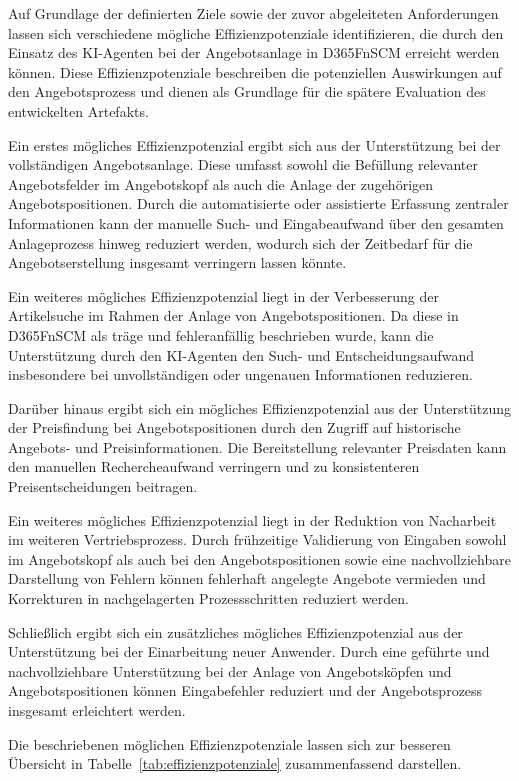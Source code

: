 Auf Grundlage der definierten Ziele sowie der zuvor abgeleiteten Anforderungen lassen sich verschiedene mögliche Effizienzpotenziale identifizieren, die durch den Einsatz des \ac{KI}-Agenten bei der Angebotsanlage in \ac{D365FnSCM} erreicht werden können. Diese Effizienzpotenziale beschreiben die potenziellen Auswirkungen auf den Angebotsprozess und dienen als Grundlage für die spätere Evaluation des entwickelten Artefakts.

Ein erstes mögliches Effizienzpotenzial ergibt sich aus der Unterstützung bei der vollständigen Angebotsanlage. Diese umfasst sowohl die Befüllung relevanter Angebotsfelder im Angebotskopf als auch die Anlage der zugehörigen Angebotspositionen. Durch die automatisierte oder assistierte Erfassung zentraler Informationen kann der manuelle Such- und Eingabeaufwand über den gesamten Anlageprozess hinweg reduziert werden, wodurch sich der Zeitbedarf für die Angebotserstellung insgesamt verringern lassen könnte.

Ein weiteres mögliches Effizienzpotenzial liegt in der Verbesserung der Artikelsuche im Rahmen der Anlage von Angebotspositionen. Da diese in \ac{D365FnSCM} als träge und fehleranfällig beschrieben wurde, kann die Unterstützung durch den \ac{KI}-Agenten den Such- und Entscheidungsaufwand insbesondere bei unvollständigen oder ungenauen Informationen reduzieren.

Darüber hinaus ergibt sich ein mögliches Effizienzpotenzial aus der Unterstützung der Preisfindung bei Angebotspositionen durch den Zugriff auf historische Angebots- und Preisinformationen. Die Bereitstellung relevanter Preisdaten kann den manuellen Rechercheaufwand verringern und zu konsistenteren Preisentscheidungen beitragen.

Ein weiteres mögliches Effizienzpotenzial liegt in der Reduktion von Nacharbeit im weiteren Vertriebsprozess. Durch frühzeitige Validierung von Eingaben sowohl im Angebotskopf als auch bei den Angebotspositionen sowie eine nachvollziehbare Darstellung von Fehlern können fehlerhaft angelegte Angebote vermieden und Korrekturen in nachgelagerten Prozessschritten reduziert werden.

Schließlich ergibt sich ein zusätzliches mögliches Effizienzpotenzial aus der Unterstützung bei der Einarbeitung neuer Anwender. Durch eine geführte und nachvollziehbare Unterstützung bei der Anlage von Angebotsköpfen und Angebotspositionen können Eingabefehler reduziert und der Angebotsprozess insgesamt erleichtert werden.

Die beschriebenen möglichen Effizienzpotenziale lassen sich zur besseren Übersicht in Tabelle~\ref{tab:effizienzpotenziale} zusammenfassend darstellen.

